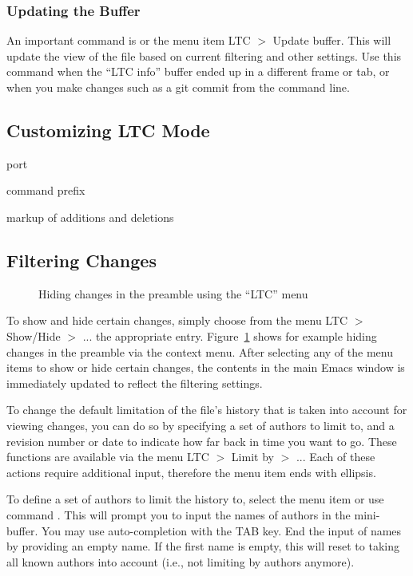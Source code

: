 \subsubsection{Updating the Buffer}

An important command is  or the menu item LTC $>$ Update buffer.  This will update the  view of the file based on current filtering and other settings.  Use this command when the ``LTC info'' buffer ended up in a different frame or tab, or when you make changes such as a git commit from the command line.

\subsection{Customizing LTC Mode}

port

command prefix

markup of additions and deletions

\subsection{Filtering Changes}

\begin{figure}[t]
\centering
{}
\caption{Hiding changes in the preamble using the ``LTC'' menu} \label{fig:emacs-hide-preamble}
\end{figure}

To show and hide certain changes, simply choose from the menu LTC $>$ Show/Hide $>$ ... the appropriate entry.  Figure~\ref{fig:emacs-hide-preamble} shows for example hiding changes in the preamble via the context menu.  %
After selecting any of the menu items to show or hide certain changes, the contents in the main Emacs window is immediately updated to reflect the filtering settings.

To change the default limitation of the file's history that is taken into account for viewing changes, you can do so by specifying a set of authors to limit to, and a revision number or date to indicate how far back in time you want to go.  These functions are available via the menu LTC $>$ Limit by $>$ ...  Each of these actions require additional input, therefore the menu item ends with ellipsis. 

To define a set of authors to limit the history to, select the menu item or use command . This will prompt you to input the names of authors in the mini-buffer.  You may use auto-completion with the TAB key.  End the input of names by providing an empty name.  If the first name is empty, this will reset to taking all known authors into account (i.e., not limiting by authors anymore).

